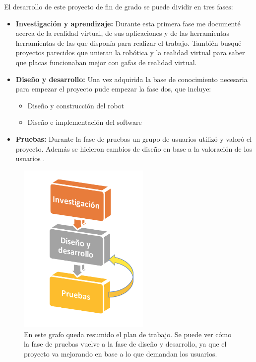 \documentclass[twoside, 11pt]{epstfg}
\begin{document}
El desarrollo de este proyecto de fin de grado se puede dividir en tres fases:
\begin{itemize}
	\item \textbf{Investigación y aprendizaje:} Durante esta primera fase me documenté acerca de la realidad virtual, de sus aplicaciones y de las herramientas herramientas de las que disponía para realizar el trabajo. También busqué proyectos parecidos que unieran la robótica y la realidad virtual para saber que placas funcionaban mejor con gafas de realidad virtual.
	
	\item \textbf{Diseño y desarrollo:} Una vez adquirida la base de conocimiento necesaria para empezar el proyecto pude empezar la fase dos, que incluye:
	\begin{itemize}
		\item Diseño y construcción del robot
		\item Diseño e implementación del software
	\end{itemize}

	\item \textbf{Pruebas:} Durante la fase de pruebas un grupo de usuarios utilizó y valoró el proyecto. Además se hicieron cambios de diseño en base a la valoración de los usuarios .
\end{itemize}

\begin{figure}[H]
	\centerline{
		\mbox{\includegraphics[width=2.50in]{images/Plan.png}}
	}
	\caption{En este grafo queda resumido el plan de trabajo. Se puede ver cómo la fase de pruebas vuelve a la fase de diseño y desarrollo, ya que el proyecto va mejorando en base a lo que demandan los usuarios.}
	\label{plan}
\end{figure}
\newpage
\end{document}
